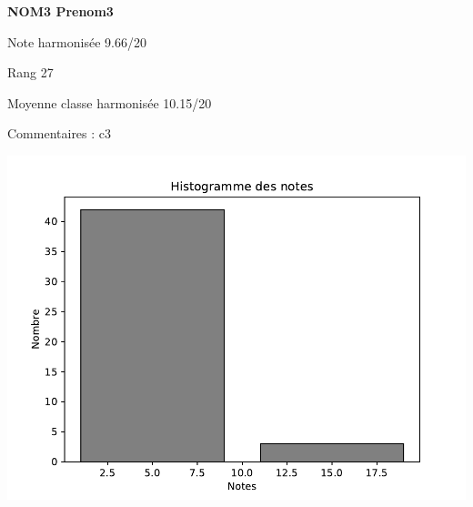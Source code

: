 \begin{minipage}[c]{.45\linewidth} 
\Large \textbf{\textsf{NOM3 Prenom3}} 
 
 \normalsize Note harmonisée 9.66/20 
 
Rang 27
 
Moyenne classe harmonisée 10.15/20 
 
Commentaires : 
c3 
\end{minipage}\hfill 
\begin{minipage}[c]{.45\linewidth}  
\begin{center}
\includegraphics[width=.8\linewidth]{../histo.pdf} 
\end{center}
\end{minipage}
\footnotesize 
